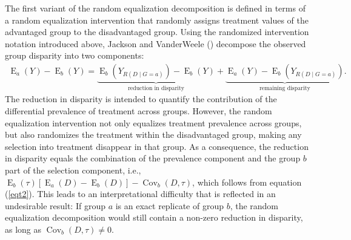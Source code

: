 \documentclass[12pt,a4paper]{article}
\newcommand{\Cov}{\operatorname{Cov}}
\newcommand{\E}{\operatorname{E}}
\begin{document}
The first variant of the random equalization decomposition is defined in terms of a random equalization intervention that randomly assigns treatment values of the advantaged group to the disadvantaged group.
Using the randomized intervention notation introduced above, Jackson and VanderWeele 
 (\citeyear{jackson_decomposition_2018}) decompose the observed group disparity into two components:
\begin{gather}
\E_a(Y)-\E_b(Y)=\underbrace{\E_b \left(Y_{R(D \mid G=a)} \right)-\E_b(Y)}_{\text{reduction in disparity}} + \underbrace{\E_a(Y)-\E_b \left(Y_{R(D \mid G=a)} \right)}_{\text{remaining disparity}} .  \nonumber 
\end{gather}
The reduction in disparity is intended to quantify the contribution of the differential prevalence of treatment across groups. 
However, the random equalization intervention not only equalizes treatment prevalence across groups, but also randomizes the treatment within the disadvantaged group, making any selection into treatment disappear in that group. As a consequence, the reduction in disparity equals the combination of the prevalence component and the group $b$ part of the selection component, i.e., $\E_b(\tau)[\E_a(D)-\E_b(D)]-\Cov_b(D, \tau)$, which follows from equation (\ref{eqt2}). This leads to an interpretational difficulty that is reflected in an undesirable result: If group $a$ is an exact replicate of group $b$, the random equalization decomposition would still contain a non-zero reduction in disparity, as long as $\Cov_b(D, \tau) \neq 0$.
\end{document}
